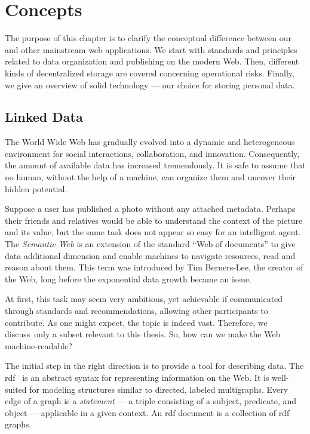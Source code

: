 \chapter{Concepts}\label{chap:concepts}

The purpose of this chapter is to clarify the conceptual difference between our and other mainstream web applications. We start with standards and principles related to data organization and publishing on the modern Web. Then, different kinds of decentralized storage are covered concerning operational risks. Finally, we give an overview of \acs{solid} technology --- our choice for storing personal data.

\section{Linked Data}\label{sec:linked-data}


The World Wide Web has gradually evolved into a dynamic and heterogeneous environment for social interactions, collaboration, and innovation. Consequently, the amount of available data has increased tremendously. It is safe to assume that no human, without the help of a machine, can organize them and uncover their hidden potential.

Suppose a user has published a photo without any attached metadata. Perhaps their friends and relatives would be able to understand the context of the picture and its value, but the same task does not appear so easy for an intelligent agent. The \emph{Semantic Web} is an extension of the standard ``Web of documents'' to give data additional dimension and enable machines to navigate resources, read and reason about them. This term was introduced by Tim Berners-Lee, the creator of the Web, long before the exponential data growth became an issue.

At first, this task may seem very ambitious, yet achievable if communicated through standards and recommendations, allowing other participants to contribute. As one might expect, the topic is indeed vast. Therefore, we discuss~only a subset relevant to this thesis. So, how can we make the Web machine-readable?

The initial step in the right direction is to provide a tool for describing data. The \ac{rdf}~\cite{rdfconcepts14} is an abstract syntax for representing information on the Web. It is well-suited for modeling structures similar to directed, labeled multigraphs. Every edge of a graph is a \emph{statement} --- a triple consisting of a subject, predicate, and object --- applicable in a given context. An \acs{rdf} document is a collection of \acs{rdf} graphs.

